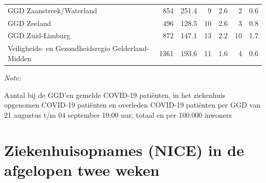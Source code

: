 \documentclass[
  english,
  man,floatsintext]{apa6}
\begin{document}
\begin{table}
\begin{threeparttable}
\begin{tabular}{lrrrrrr}
GGD Zaanstreek/Waterland & 854 & 251.4 & 9 & 2.6 & 2 & 0.6\\
GGD Zeeland & 496 & 128.5 & 10 & 2.6 & 3 & 0.8\\
GGD Zuid-Limburg & 872 & 147.1 & 13 & 2.2 & 10 & 1.7\\
Veiligheids- en Gezondheidsregio Gelderland-Midden & 1361 & 193.6 & 11 & 1.6 & 4 & 0.6\\
\bottomrule
\end{tabular}
\begin{tablenotes}
\item \textit{Note: } 
\item Aantal bij de GGD’en gemelde COVID-19 patiënten, in het ziekenhuis opgenomen COVID-19 patiënten en overleden COVID-19 patiënten per GGD van 21 augustus t/m 04 september 10:00 uur, totaal en per 100.000 inwoners
\end{tablenotes}
\end{threeparttable}
\endgroup{}
\end{table}

\newpage

\hypertarget{ziekenhuisopnames-nice-in-de-afgelopen-twee-weken}{%
\section{Ziekenhuisopnames (NICE) in de afgelopen twee weken}\label{ziekenhuisopnames-nice-in-de-afgelopen-twee-weken}}
\end{document}
